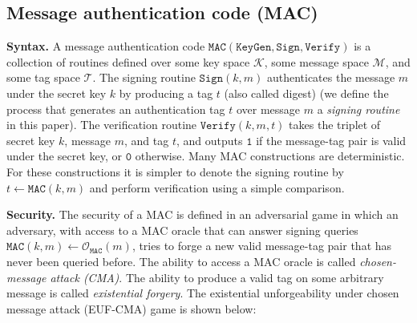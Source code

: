 \documentclass[runningheads]{llncs}
\newcommand{\keygen}{\texttt{KeyGen}}
\newcommand{\mac}{\texttt{MAC}}
\newcommand{\sign}{\texttt{Sign}}
\newcommand{\verify}{\texttt{Verify}}
\begin{document}
\subsection{Message authentication code (MAC)}\label{sec:message-authentication-code}
\textbf{Syntax.} A message authentication code $\mac(\keygen, \sign, \verify)$ is a collection of routines defined over some key space $\mathcal{K}$, some message space $\mathcal{M}$, and some tag space $\mathcal{T}$. The signing routine $\sign(k, m)$ authenticates the message $m$ under the secret key $k$ by producing a tag $t$ (also called digest) (we define the process that generates an authentication tag $t$ over message $m$ a \textit{signing routine} in this paper). The verification routine $\verify(k, m, t)$ takes the triplet of secret key $k$, message $m$, and tag $t$, and outputs $\texttt{1}$ if the message-tag pair is valid under the secret key, or $\texttt{0}$ otherwise. Many MAC constructions are deterministic. For these constructions it is simpler to denote the signing routine by $t \leftarrow \mac(k, m)$ and perform verification using a simple comparison.

\textbf{Security.} The security of a MAC is defined in an adversarial game in which an adversary, with access to a MAC oracle that can answer signing queries $\mac(k, m) \leftarrow \mathcal{O}_\mac(m)$, tries to forge a new valid message-tag pair that has never been queried before. The ability to access a MAC oracle is called \emph{chosen-message attack (CMA)}. The ability to produce a valid tag on some arbitrary message is called \emph{existential forgery}. The existential unforgeability under chosen message attack (EUF-CMA) game is shown below:
\end{document}
